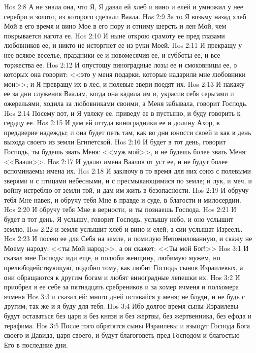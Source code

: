 \vs Hos 2:8 А не знала она, что Я, Я давал ей хлеб и вино и елей и умножил у нее серебро и золото, из которого сделали  Ваала.
\vs Hos 2:9 За то Я возьму назад хлеб Мой в его время и вино Мое в его пору и отниму шерсть и лен Мой, чем покрывается нагота ее.
\vs Hos 2:10 И ныне открою срамоту ее пред глазами любовников ее, и никто не исторгнет ее из руки Моей.
\vs Hos 2:11 И прекращу у нее всякое веселье, праздники ее и новомесячия ее, и субботы ее, и все торжества ее.
\vs Hos 2:12 И опустошу виноградные лозы ее и смоковницы ее, о которых она говорит: <<это у меня подарки, которые надарили мне любовники мои>>; и Я превращу их в лес, и полевые звери поедят их.
\vs Hos 2:13 И накажу ее за дни служения Ваалам, когда она кадила им и, украсив себя серьгами и ожерельями, ходила за любовниками своими, а Меня забывала, говорит Господь.
\vs Hos 2:14 Посему вот, и Я увлеку ее, приведу ее в пустыню, и буду говорить к сердцу ее.
\vs Hos 2:15 И дам ей оттуда виноградники ее и долину Ахор, в преддверие надежды; и она будет петь там, как во дни юности своей и как в день выхода своего из земли Египетской.
\vs Hos 2:16 И будет в тот день, говорит Господь, ты будешь звать Меня: <<муж мой>>, и не будешь более звать Меня: <<Ваали>>.
\vs Hos 2:17 И удалю имена Ваалов от уст ее, и не будут более вспоминаемы имена их.
\vs Hos 2:18 И заключу в то время для них союз с полевыми зверями и с птицами небесными, и с пресмыкающимися по земле; и лук, и меч, и войну истреблю от земли той, и дам им жить в безопасности.
\vs Hos 2:19 И обручу тебя Мне навек, и обручу тебя Мне в правде и суде, в благости и милосердии.
\vs Hos 2:20 И обручу тебя Мне в верности, и ты познаешь Господа.
\vs Hos 2:21 И будет в тот день, Я услышу, говорит Господь, услышу небо, и оно услышит землю,
\vs Hos 2:22 и земля услышит хлеб и вино и елей; а сии услышат Изреель.
\vs Hos 2:23 И посею ее для Себя на земле, и помилую Непомилованную, и скажу не Моему народу: <<ты Мой народ>>, а он скажет: <<Ты мой Бог!>>
\vs Hos 3:1 И сказал мне Господь: иди еще, и полюби женщину, любимую мужем, но прелюбодействующую, подобно тому, как любит Господь сынов Израилевых, а они обращаются к другим богам и любят виноградные лепешки их.
\vs Hos 3:2 И приобрел я ее себе за пятнадцать сребреников и за хомер ячменя и полхомера ячменя
\vs Hos 3:3 и сказал ей: много дней оставайся у меня; не блуди, и не будь с другим; так же и я буду для тебя.
\vs Hos 3:4 Ибо долгое время сыны Израилевы будут оставаться без царя и без князя и без жертвы, без жертвенника, без ефода и терафима.
\vs Hos 3:5 После того обратятся сыны Израилевы и взыщут Господа Бога своего и Давида, царя своего, и будут благоговеть пред Господом и благостью Его в последние дни.
